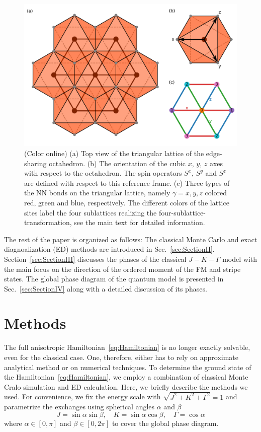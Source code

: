 \documentclass[aps,prb,reprint,amsfonts,amsmath,amssymb,showpacs,groupedaddress,superscriptaddress]{revtex4-1}
\begin{document}
\begin{figure}
    \includegraphics[width=\columnwidth]{Fig1.pdf}
    \caption{\label{fig:ModelDefinition}(Color online) (a) Top view of the triangular lattice of the edge-sharing octahedron. (b) The orientation of the cubic $x$, $y$, $z$ axes with respect to the octahedron. The spin operators $S^x$, $S^y$ and $S^z$ are defined with respect to this reference frame. (c) Three types of the NN bonds on the triangular lattice, namely $\gamma=x, y, z$ colored red, green and blue, respectively. The different colors of the lattice sites label the four sublattices realizing the four-sublattice-transformation, see the main text for detailed information.}
\end{figure}

The rest of the paper is organized as follows: The classical Monte Carlo and exact diagnoalization (ED) methods are introduced in Sec.~\ref{sec:SectionII}. Section~\ref{sec:SectionIII} discusses the phases of the classical $J-K-\Gamma$ model with the main focus on the direction of the ordered moment of the FM and stripe states. The global phase diagram of the quantum model is presented in Sec.~\ref{sec:SectionIV} along with a detailed discussion of its phases.

\section{\label{sec:SectionII}Methods}
The full anisotropic Hamiltonian~\eqref{eq:Hamiltonian} is no longer exactly solvable, even for the classical case. One, therefore, either has to rely on approximate analytical method or on numerical techniques. To determine the ground state of the Hamiltonian~\eqref{eq:Hamiltonian}, we employ a combination of classical Monte Cralo simulation and ED calculation. Here, we briefly describe the methods we used. For convenience, we fix the energy scale with $\sqrt{J^2 + K^2 + \Gamma^2}=1$ and parametrize the exchanges using spherical angles $\alpha$ and $\beta$
\begin{equation}
    J = \sin\alpha \sin\beta, \quad
    K = \sin\alpha \cos\beta, \quad
    \Gamma = \cos\alpha \label{eq:Parameters}
\end{equation}
where $\alpha \in [0, \pi]$ and $\beta \in [0, 2\pi]$ to cover the global phase diagram.
\end{document}
